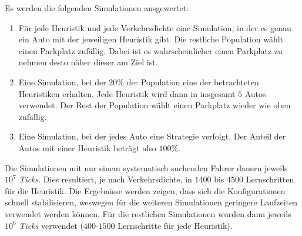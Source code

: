 Es werden die folgenden Simulationen ausgewertet:
\begin{enumerate}
	\item Für jede Heuristik und jede Verkehrsdichte eine Simulation, in der es genau ein Auto mit der jeweiligen Heuristik gibt. Die restliche Population wählt einen Parkplatz zufällig. Dabei ist es wahrscheinlicher einen Parkplatz zu nehmen desto näher dieser am Ziel ist.
	\item Eine Simulation, bei der $20\%$ der Population eine der betrachteten Heuristiken erhalten. Jede Heuristik wird dann in insgesamt $5$ Autos verwendet. Der Rest der Population wählt einen Parkplatz wieder wie oben zufällig. 
	\item Eine Simulation, bei der jedes Auto eine Strategie verfolgt. Der Anteil der Autos mit einer Heuristik beträgt also $100\%$.
\end{enumerate}
Die Simulationen mit nur einem systematisch suchenden Fahrer dauern jeweils $10^7$ \emph{Ticks}. Dies resultiert, je nach Verkehrsdichte, in $1400$ bis $4500$ Lernschritten für die Heuristik. Die Ergebnisse werden zeigen, dass sich die Konfigurationen schnell stabilisieren, weswegen für die weiteren Simulationen geringere Laufzeiten verwendet werden können. Für die restlichen Simulationen wurden dann jeweils $10^6$ \emph{Ticks} verwendet ($400$-$1500$ Lernschritte für jede Heuristik).